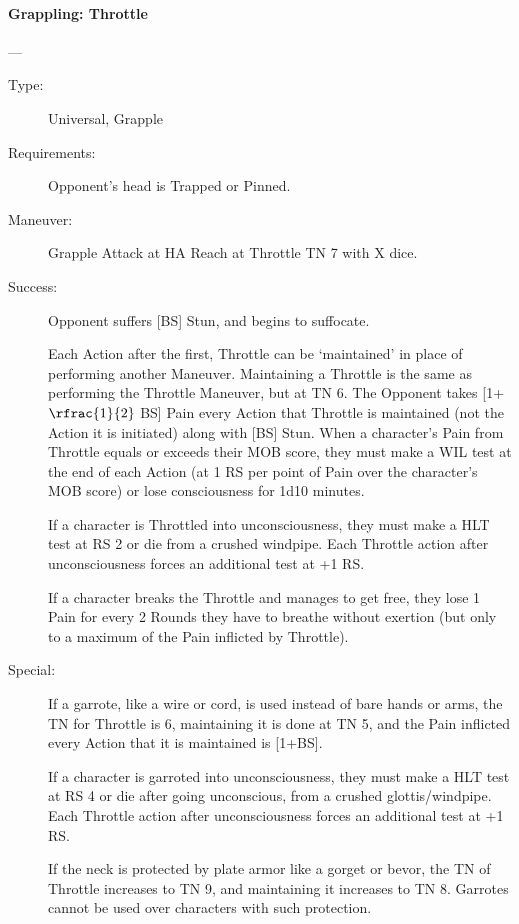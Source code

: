 \paragraph{Grappling: Throttle \large} \label{man:grappling-throttle}
---\quad {\large [X]}
\vspace{-10pt} \begin{description}
\item [Type:] Universal, Grapple
\item [Requirements:] Opponent's head is Trapped or Pinned.
\item [Maneuver:] Grapple Attack at HA Reach at Throttle TN 7 with X dice.
\item [Success:] Opponent suffers [BS] Stun, and begins to suffocate.

Each Action after the first, Throttle can be ‘maintained’ in place of performing
another Maneuver. Maintaining a Throttle is the same as performing the Throttle
Maneuver, but at TN 6. The Opponent takes [1+$\rfrac{1}{2}$ BS] Pain every Action that
Throttle is maintained (not the Action it is initiated) along with [BS] Stun.
When a character's Pain from Throttle equals or exceeds their MOB score, they
must make a WIL test at the end of each Action (at 1 RS per point of Pain over
the character's MOB score) or lose consciousness for 1d10 minutes. 

If a character is Throttled into unconsciousness, they must make a HLT test at
RS 2 or die from a crushed windpipe. Each Throttle action after unconsciousness
forces an additional test at +1 RS.   

If a character breaks the Throttle and manages to get free, they lose 1 Pain for
every 2 Rounds they have to breathe without exertion (but only to a maximum of
the Pain inflicted by Throttle). 
\item [Special:] If a garrote, like a wire or cord, is used instead of bare
  hands or arms, the TN for Throttle is 6, maintaining it is done at TN 5, and
  the Pain inflicted every Action that it is maintained is [1+BS].

  If a character is garroted into unconsciousness, they must make a HLT test at
  RS 4 or die after going unconscious, from a crushed glottis/windpipe. Each
  Throttle action after unconsciousness forces an additional test at +1 RS.

  If the neck is protected by plate armor like a gorget or bevor, the TN of
  Throttle increases to TN 9, and maintaining it increases to TN 8. Garrotes
  cannot be used over characters with such protection.
\end{description} 

